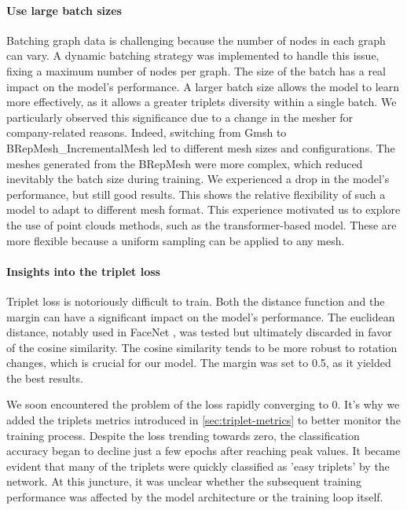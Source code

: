 \paragraph{Use large batch sizes}

Batching graph data is challenging because the number of nodes in each graph can vary. A dynamic batching strategy was implemented to handle this issue, fixing a maximum number of nodes per graph.
The size of the batch has a real impact on the model's performance. A larger batch size allows the model to learn more effectively, as it allows a greater triplets diversity within a single batch. We particularly observed this significance due to a change in the mesher for company-related reasons. Indeed, switching from Gmsh \cite{GmshThreedimensionalFinite} to BRepMesh\_IncrementalMesh \cite{BRepMesh_IncrementalMeshClassReference} led to different mesh sizes and configurations. The meshes generated from the BRepMesh were more complex, which reduced inevitably the batch size during training. We experienced a drop in the model's performance, but still good results. This shows the relative flexibility of such a model to adapt to different mesh format. This experience motivated us to explore the use of point clouds methods, such as the transformer-based model. These are more flexible because a uniform sampling can be applied to any mesh.

\paragraph{Insights into the triplet loss}
\label{sec:triplet-loss-insights}

Triplet loss is notoriously difficult to train. Both the distance function and the margin can have a significant impact on the model's performance. The euclidean distance, notably used in FaceNet \cite{schroffFaceNetUnifiedEmbedding2015}, was tested but ultimately discarded in favor of the cosine similarity. The cosine similarity tends to be more robust to rotation changes, which is crucial for our model. The margin was set to 0.5, as it yielded the best results.

We soon encountered the problem of the loss rapidly converging to 0. It's why we added the triplets metrics introduced in \autoref{sec:triplet-metrics} to better monitor the training process.
Despite the loss trending towards zero, the classification accuracy began to decline just a few epochs after reaching peak values.
It became evident that many of the triplets were quickly classified as 'easy triplets' by the network. At this juncture, it was unclear whether the subsequent training performance was affected by the model architecture or the training loop itself.

